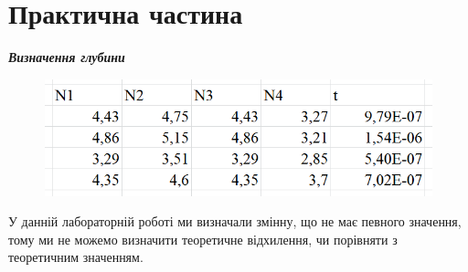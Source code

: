 \section{Практична частина}
\setlength{\parindent}{4em}

\begin{center}
  {\textbf{\emph{Визначення глубини}}}
\end{center}
\begin{figure}[ht]

\centering

\includegraphics[width=0.55\linewidth]{Pics/table1.png}


\label{Teo}

\end{figure}
У данній лабораторній роботі ми визначали змінну, що не має певного значення, тому ми не можемо визначити теоретичне відхилення, чи порівняти з теоретичним значенням.
